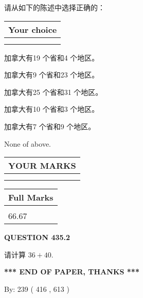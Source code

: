 \documentclass{ctexart}
\begin{document}
  
请从如下的陈述中选择正确的：
  
  
\noindent\hspace{3.0in} \begin{tabular}{|l|}
\hline
Your choice \\
\hline
 \\ 
 \\ 
\hline
\end{tabular}
  
  
 
 
加拿大有19 个省和4 个地区。
 
 
加拿大有9 个省和23 个地区。
 
 
加拿大有25 个省和31 个地区。
 
 
加拿大有10 个省和3 个地区。
 
 
加拿大有7 个省和9 个地区。
 
 
 None of above.
 
 
  
\vspace{0.2in}
  
\noindent\begin{tabular}{|l|}
\hline
 YOUR MARKS  \\
\hline
 \\ 
 \\ 
\hline
\end{tabular}
\hspace{0.05in} \begin{tabular}{|l|}
\hline
 Full Marks  \\
\hline
 \\ 
66.67 \\
\hline
\end{tabular}
{\textbf{\Large{QUESTION
435.2 
}}}
  
  
 
请计算 $ %
36 +  %
40 $.
 

 

 
   
   
 \vspace{0.2in}
 
   
   
   
   
\vspace{1.0in} 
{\textbf{\large{ *** END OF PAPER, THANKS *** }}} 
   
   
\hspace{1.0in} By: 
 239 ( 416 ,  613 )
   
\end{document}
